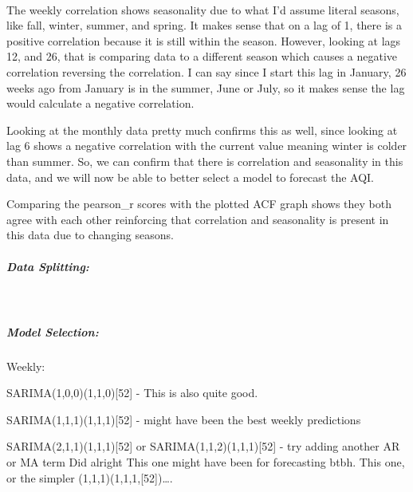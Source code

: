 \documentclass[11pt, twocolumn]{article}
\begin{document}
    \begin{center}
    \end{center}
    { \hspace*{\fill} \\}
    
    The weekly correlation shows seasonality due to what I'd assume literal
seasons, like fall, winter, summer, and spring. It makes sense that on a
lag of 1, there is a positive correlation because it is still within the
season. However, looking at lags 12, and 26, that is comparing data to a
different season which causes a negative correlation reversing the
correlation. I can say since I start this lag in January, 26 weeks ago
from January is in the summer, June or July, so it makes sense the lag
would calculate a negative correlation.

Looking at the monthly data pretty much confirms this as well, since
looking at lag 6 shows a negative correlation with the current value
meaning winter is colder than summer. So, we can confirm that there is
correlation and seasonality in this data, and we will now be able to
better select a model to forecast the AQI.

Comparing the pearson\_r scores with the plotted ACF graph shows they
both agree with each other reinforcing that correlation and seasonality
is present in this data due to changing seasons.

    \subparagraph{Data Splitting:}\label{data-splitting}

    \begin{center}
    \end{center}
    { \hspace*{\fill} \\}
    
    \subparagraph{Model Selection:}\label{model-selection}

    Weekly:

SARIMA(1,0,0)(1,1,0){[}52{]} - This is also quite good.

SARIMA(1,1,1)(1,1,1){[}52{]} - might have been the best weekly
predictions

SARIMA(2,1,1)(1,1,1){[}52{]} or SARIMA(1,1,2)(1,1,1){[}52{]} - try
adding another AR or MA term \textbar{} \textbar\textbar{} Did alright
This one might have been for forecasting btbh. This one, or the simpler
(1,1,1)(1,1,1,{[}52{]})\ldots.
\end{document}
